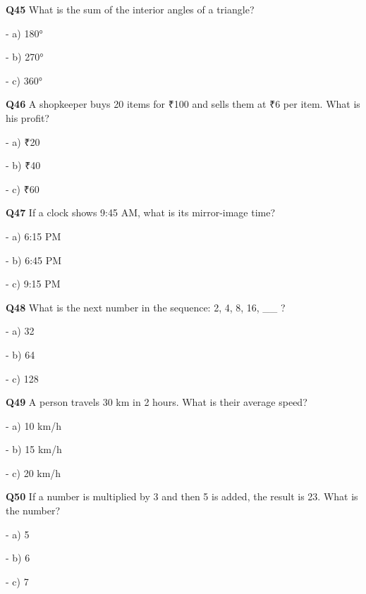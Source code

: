 \textbf{Q45} What is the sum of the interior angles of a triangle?\par
\quad - a) 180°\par
\quad - b) 270°\par
\quad - c) 360°\par

\textbf{Q46} A shopkeeper buys 20 items for ₹100 and sells them at ₹6 per item. What is his profit?\par
\quad - a) ₹20\par
\quad - b) ₹40\par
\quad - c) ₹60\par

\textbf{Q47} If a clock shows 9:45 AM, what is its mirror-image time?\par
\quad - a) 6:15 PM\par
\quad - b) 6:45 PM\par
\quad - c) 9:15 PM\par

\textbf{Q48} What is the next number in the sequence: 2, 4, 8, 16, __ ?\par
\quad - a) 32\par
\quad - b) 64\par
\quad - c) 128\par

\textbf{Q49} A person travels 30 km in 2 hours. What is their average speed?\par
\quad - a) 10 km/h\par
\quad - b) 15 km/h\par
\quad - c) 20 km/h\par

\textbf{Q50} If a number is multiplied by 3 and then 5 is added, the result is 23. What is the number?\par
\quad - a) 5\par
\quad - b) 6\par
\quad - c) 7\par